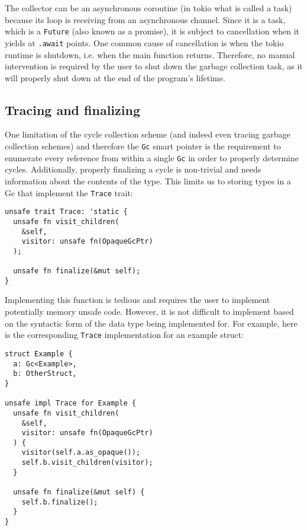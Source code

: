 \documentclass[sigplan]{acmart}
\begin{document}
The collector can be an asynchronous coroutine (in tokio what is called a task)
because its loop is receiving from an asynchronous channel. Since it is a task,
which is a \texttt{Future} (also known as a promise), it is subject to
cancellation \cite{cancellation} when it yields at \texttt{.await} points.
One common cause of cancellation is when the tokio runtime is shutdown,
i.e. when the main function returns. Therefore, no manual intervention is
required by the user to shut down the garbage collection task, as it will
properly shut down at the end of the program's lifetime.

\subsection{Tracing and finalizing}

One limitation of the cycle collection scheme (and indeed even tracing garbage
collection schemes) and therefore the \texttt{Gc} smart pointer is the
requirement to enumerate every reference from within a single \texttt{Gc} in
order to properly determine cycles. Additionally, properly finalizing a cycle is
non-trivial and needs information about the contents of the type. This limits us
to storing types in a Gc that implement the \texttt{Trace} trait:

\begin{verbatim}
unsafe trait Trace: 'static {
  unsafe fn visit_children(
    &self,
    visitor: unsafe fn(OpaqueGcPtr)
  );

  unsafe fn finalize(&mut self);
}
\end{verbatim}

Implementing this function is tedious and requires the user to implement
potentially memory unsafe code. However, it is not difficult to implement based
on the syntactic form of the data type being implemented for. For example, here
is the corresponding \texttt{Trace} implementation for an example struct:

\vfill\null

\begin{verbatim}
struct Example {
  a: Gc<Example>,
  b: OtherStruct,
}

unsafe impl Trace for Example {
  unsafe fn visit_children(
    &self,
    visitor: unsafe fn(OpaqueGcPtr)
  ) {
    visitor(self.a.as_opaque());
    self.b.visit_children(visitor);
  }

  unsafe fn finalize(&mut self) {
    self.b.finalize();
  }
}
\end{verbatim}
\end{document}
